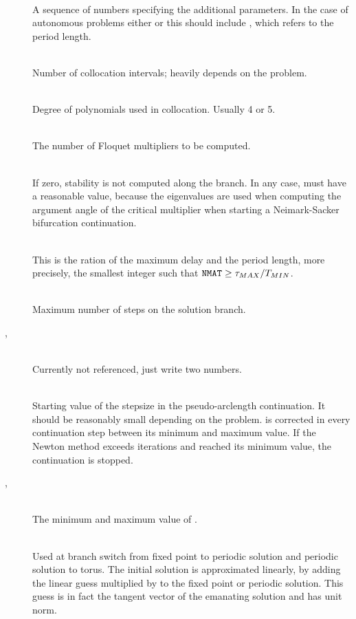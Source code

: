 \documentclass[10pt,a4paper]{ddedoc}
\begin{document}
\begin{description}
%
\item[] ~\\
A sequence of numbers specifying the additional parameters. In
the case of autonomous problems either  or this should include , which refers to the period length.
%
\item[] ~\\
Number of collocation intervals; heavily depends on the problem.
%
\item[] ~\\
Degree of polynomials used in collocation. Usually 4 or 5.
%
\item[] ~\\
The number of Floquet multipliers to be computed.
%
\item[] ~\\
If zero, stability is not computed along the branch. In any case,  must have a reasonable value, because the eigenvalues are used when computing the argument angle of the critical multiplier when starting a Neimark-Sacker bifurcation continuation.
%
\item[] ~\\
This is the ration of the maximum delay and the period length, more precisely, the smallest integer such that ${\tt NMAT} \ge \tau_{MAX}/T_{MIN}$.
%
\item[] ~\\
Maximum number of steps on the solution branch.
%
\item[, ] ~\\
Currently not referenced, just write two numbers.
%
\item[] ~\\
Starting value of the stepsize in the pseudo-arclength continuation.
It should be reasonably small depending on the problem.  is corrected in every continuation step between its minimum and maximum value. If the Newton method exceeds  iterations and  reached its minimum value, the continuation is stopped.
%
\item[, ] ~\\
The minimum and maximum value of .
%
\item[] ~\\
Used at branch switch from fixed point to periodic solution and periodic solution to torus. The initial solution is approximated linearly, by adding the linear guess multiplied by  to the fixed point or periodic solution. This guess is in fact the tangent vector of the emanating solution and has unit norm.

\end{description}
\end{document}
